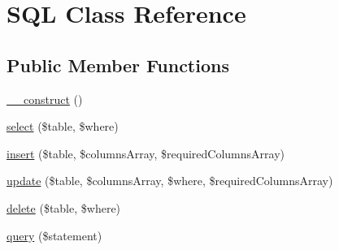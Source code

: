 \hypertarget{class_w_a_f_f_l_e_1_1_framework_1_1_adapters_1_1_s_q_l}{}\section{S\+QL Class Reference}
\label{class_w_a_f_f_l_e_1_1_framework_1_1_adapters_1_1_s_q_l}
\subsection*{Public Member Functions}
\begin{DoxyCompactItemize}
\item 
\hyperlink{class_w_a_f_f_l_e_1_1_framework_1_1_adapters_1_1_s_q_l_a095c5d389db211932136b53f25f39685}{\+\_\+\+\_\+construct} ()
\item 
\hyperlink{class_w_a_f_f_l_e_1_1_framework_1_1_adapters_1_1_s_q_l_aba0493523bdf57cda549e4573bd13b59}{select} (\$table, \$where)
\item 
\hyperlink{class_w_a_f_f_l_e_1_1_framework_1_1_adapters_1_1_s_q_l_a3d8ffa8e31467a39295e6b2bcb324145}{insert} (\$table, \$columns\+Array, \$required\+Columns\+Array)
\item 
\hyperlink{class_w_a_f_f_l_e_1_1_framework_1_1_adapters_1_1_s_q_l_ae4dc7407d8834dd3721b5d5bb57d8c9a}{update} (\$table, \$columns\+Array, \$where, \$required\+Columns\+Array)
\item 
\hyperlink{class_w_a_f_f_l_e_1_1_framework_1_1_adapters_1_1_s_q_l_a7d14a9de8bac5dd9b5cfec163e448157}{delete} (\$table, \$where)
\item 
\hyperlink{class_w_a_f_f_l_e_1_1_framework_1_1_adapters_1_1_s_q_l_a06c44c57089a129f4a10108b78e56c75}{query} (\$statement)
\end{DoxyCompactItemize}
